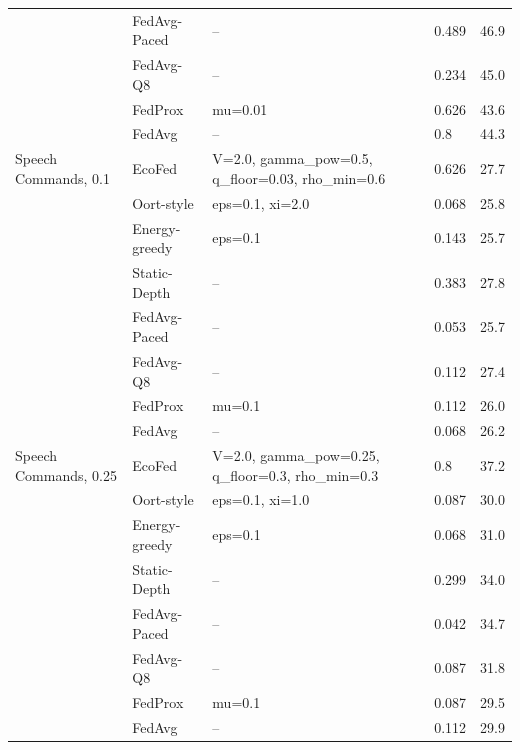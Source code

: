 \begin{tabular}{@{}llllc@{}}
 & FedAvg-Paced & -- & 0.489 & 46.9\\
 & FedAvg-Q8 & -- & 0.234 & 45.0\\
 & FedProx & mu=0.01 & 0.626 & 43.6\\
 & FedAvg & -- & 0.8 & 44.3\\
\midrule
Speech Commands, 0.1 & EcoFed & V=2.0, gamma\_pow=0.5, q\_floor=0.03, rho\_min=0.6 & 0.626 & 27.7\\
 & Oort-style & eps=0.1, xi=2.0 & 0.068 & 25.8\\
 & Energy-greedy & eps=0.1 & 0.143 & 25.7\\
 & Static-Depth & -- & 0.383 & 27.8\\
 & FedAvg-Paced & -- & 0.053 & 25.7\\
 & FedAvg-Q8 & -- & 0.112 & 27.4\\
 & FedProx & mu=0.1 & 0.112 & 26.0\\
 & FedAvg & -- & 0.068 & 26.2\\
\midrule
Speech Commands, 0.25 & EcoFed & V=2.0, gamma\_pow=0.25, q\_floor=0.3, rho\_min=0.3 & 0.8 & 37.2\\
 & Oort-style & eps=0.1, xi=1.0 & 0.087 & 30.0\\
 & Energy-greedy & eps=0.1 & 0.068 & 31.0\\
 & Static-Depth & -- & 0.299 & 34.0\\
 & FedAvg-Paced & -- & 0.042 & 34.7\\
 & FedAvg-Q8 & -- & 0.087 & 31.8\\
 & FedProx & mu=0.1 & 0.087 & 29.5\\
 & FedAvg & -- & 0.112 & 29.9\\
\bottomrule
\end{tabular}